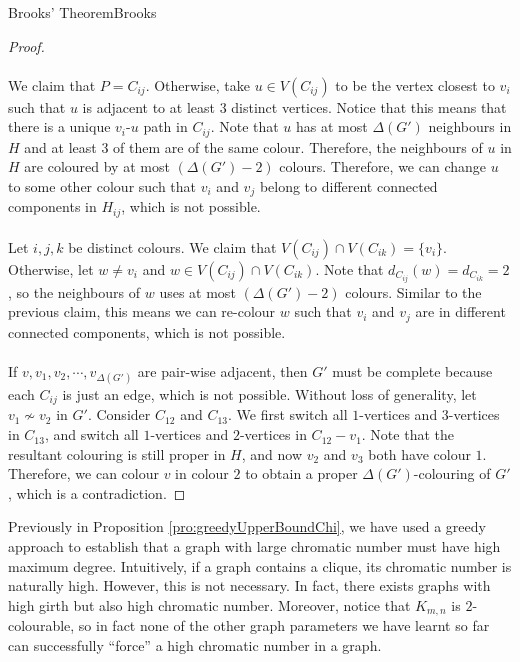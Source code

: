 \documentclass[math]{amznotes}
\theoremstyle{remark}
\begin{document}
\begin{thmbox}{Brooks' Theorem}{Brooks}
\begin{proof}
        \\\\
        We claim that $P = C_{ij}$. Otherwise, take $u \in V(C_{ij})$ to be the vertex closest to $v_i$ such that $u$ is adjacent to at least $3$ distinct vertices. Notice that this means that there is a unique $v_i$-$u$ path in $C_{ij}$. Note that $u$ has at most $\Delta(G')$ neighbours in $H$ and at least $3$ of them are of the same colour. Therefore, the neighbours of $u$ in $H$ are coloured by at most $(\Delta(G') - 2)$ colours. Therefore, we can change $u$ to some other colour such that $v_i$ and $v_j$ belong to different connected components in $H_{ij}$, which is not possible.
        \\\\
        Let $i, j, k$ be distinct colours. We claim that $V(C_{ij}) \cap V(C_{ik}) = \{v_i\}$. Otherwise, let $w \neq v_i$ and $w \in V(C_{ij}) \cap V(C_{ik})$. Note that $d_{C_{ij}}(w) = d_{C_{ik}} = 2$, so the neighbours of $w$ uses at most $(\Delta(G') - 2)$ colours. Similar to the previous claim, this means we can re-colour $w$ such that $v_i$ and $v_j$ are in different connected components, which is not possible.
        \\\\
        If $v, v_1, v_2, \cdots, v_{\Delta(G')}$ are pair-wise adjacent, then $G'$ must be complete because each $C_{ij}$ is just an edge, which is not possible. Without loss of generality, let $v_1 \not\sim v_2$ in $G'$. Consider $C_{12}$ and $C_{13}$. We first switch all $1$-vertices and $3$-vertices in $C_{13}$, and switch all $1$-vertices and $2$-vertices in $C_{12} - v_1$. Note that the resultant colouring is still proper in $H$, and now $v_2$ and $v_3$ both have colour $1$. Therefore, we can colour $v$ in colour $2$ to obtain a proper $\Delta(G')$-colouring of $G'$, which is a contradiction.
    \end{proof}
\end{thmbox}
Previously in Proposition \ref{pro:greedyUpperBoundChi}, we have used a greedy approach to establish that a graph with large chromatic number must have high maximum degree. Intuitively, if a graph contains a clique, its chromatic number is naturally high. However, this is not necessary. In fact, there exists graphs with high girth but also high chromatic number. Moreover, notice that $K_{m, n}$ is $2$-colourable, so in fact none of the other graph parameters we have learnt so far can successfully ``force'' a high chromatic number in a graph.
\end{document}
